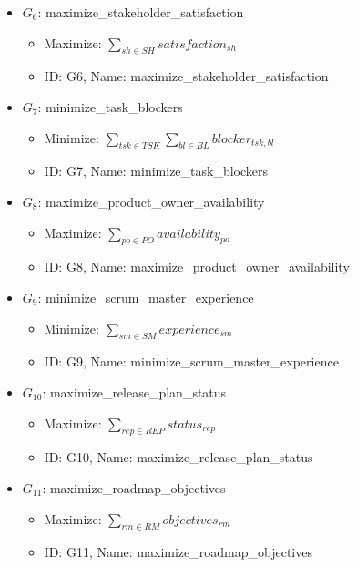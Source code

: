 \documentclass{article}
\begin{document}
\begin{itemize}
\begin{itemize}
        \end{itemize}
    \item $G_6$: maximize\_stakeholder\_satisfaction
        \begin{itemize}
            \item Maximize: $\sum_{sh \in SH} satisfaction_{sh}$
            \item ID: G6, Name: maximize\_stakeholder\_satisfaction
        \end{itemize}
    \item $G_7$: minimize\_task\_blockers
        \begin{itemize}
            \item Minimize: $\sum_{tsk \in TSK} \sum_{bl \in BL} blocker_{tsk,bl}$
            \item ID: G7, Name: minimize\_task\_blockers
        \end{itemize}
    \item $G_8$: maximize\_product\_owner\_availability
        \begin{itemize}
            \item Maximize: $\sum_{po \in PO} availability_{po}$
            \item ID: G8, Name: maximize\_product\_owner\_availability
        \end{itemize}
    \item $G_9$: minimize\_scrum\_master\_experience
        \begin{itemize}
            \item Minimize: $\sum_{sm \in SM} experience_{sm}$
            \item ID: G9, Name: minimize\_scrum\_master\_experience
        \end{itemize}
    \item $G_{10}$: maximize\_release\_plan\_status
        \begin{itemize}
            \item Maximize: $\sum_{rep \in REP} status_{rep}$
            \item ID: G10, Name: maximize\_release\_plan\_status
        \end{itemize}
    \item $G_{11}$: maximize\_roadmap\_objectives
        \begin{itemize}
            \item Maximize: $\sum_{rm \in RM} objectives_{rm}$
            \item ID: G11, Name: maximize\_roadmap\_objectives
        \end{itemize}

\end{itemize}
\end{document}
